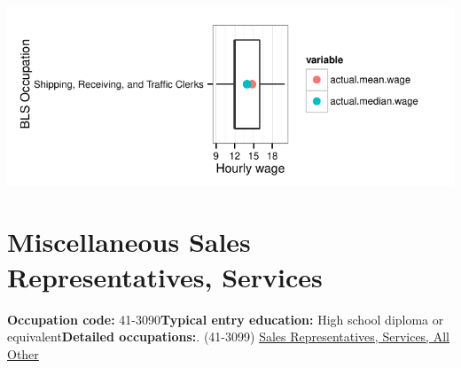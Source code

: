 \documentclass[a4paper,10pt]{article}\usepackage[]{graphicx}\usepackage[]{color}
\makeatletter
\def\maxwidth{ %
  \ifdim\Gin@nat@width>\linewidth
    \linewidth
  \else
    \Gin@nat@width
  \fi
}
\makeatother
\begin{document}
{\centering \includegraphics[width=\maxwidth]{figure/unnamed-chunk-241} 

}


\newpage\section{Miscellaneous Sales Representatives, Services}\textbf{Occupation code:} 41-3090\newline\textbf{Typical entry education:} High school diploma or equivalent\newline\textbf{Detailed occupations:}. (41-3099)  \href{http://www.bls.gov/oes/current/oes413099.htm}{Sales Representatives, Services, All Other}\newline%
\end{document}
